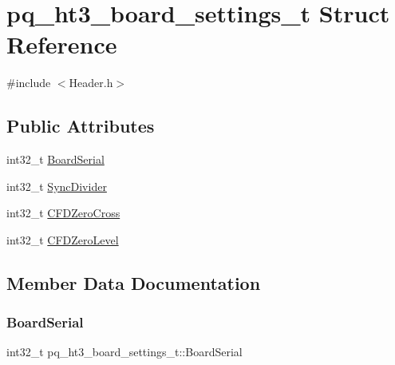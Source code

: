 \hypertarget{structpq__ht3__board__settings__t}{}\section{pq\+\_\+ht3\+\_\+board\+\_\+settings\+\_\+t Struct Reference}
\label{structpq__ht3__board__settings__t}


{\ttfamily \#include $<$Header.\+h$>$}

\subsection*{Public Attributes}
\begin{DoxyCompactItemize}
\item 
int32\+\_\+t \hyperlink{structpq__ht3__board__settings__t_a7f3eda5eebde8ff61dc9eabd187dc359}{Board\+Serial}
\item 
int32\+\_\+t \hyperlink{structpq__ht3__board__settings__t_af106b3dcfe836a2df68033929c7c0d27}{Sync\+Divider}
\item 
int32\+\_\+t \hyperlink{structpq__ht3__board__settings__t_a6825d115d96985ab64f39aca3162466c}{C\+F\+D\+Zero\+Cross}
\item 
int32\+\_\+t \hyperlink{structpq__ht3__board__settings__t_a8101b4213a3f2ed58c39bf11a429399f}{C\+F\+D\+Zero\+Level}
\end{DoxyCompactItemize}


\subsection{Member Data Documentation}
\mbox{\label{structpq__ht3__board__settings__t_a7f3eda5eebde8ff61dc9eabd187dc359}} 
\subsubsection{\texorpdfstring{Board\+Serial}{BoardSerial}}
{\footnotesize\ttfamily int32\+\_\+t pq\+\_\+ht3\+\_\+board\+\_\+settings\+\_\+t\+::\+Board\+Serial}

\mbox{\label{structpq__ht3__board__settings__t_a6825d115d96985ab64f39aca3162466c}} 
